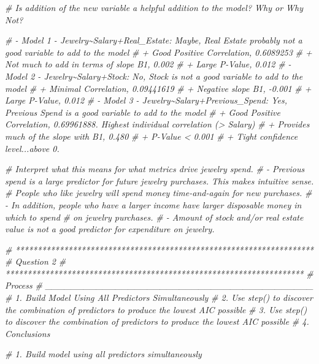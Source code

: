 \documentclass[
]{article}
\newenvironment{Shaded}{\begin{snugshade}}{\end{snugshade}}
\newcommand{\CommentTok}[1]{\textcolor[rgb]{0.56,0.35,0.01}{\textit{#1}}}
\begin{document}
\begin{Shaded}
\begin{Highlighting}[]
\CommentTok{\# Is addition of the new variable a helpful addition to the model? Why or Why Not?}
 
\CommentTok{\# {-} Model 1 {-} Jewelry\textasciitilde{}Salary+Real\_Estate: Maybe, Real Estate probably not a good variable to add to the model}
\CommentTok{\#     + Good Positive Correlation, 0.6089253}
\CommentTok{\#     + Not much to add in terms of slope B1, 0.002}
\CommentTok{\#     + Large P{-}Value, 0.012}
\CommentTok{\# {-} Model 2 {-} Jewelry\textasciitilde{}Salary+Stock: No, Stock is not a good variable to add to the model}
\CommentTok{\#     + Minimal Correlation, 0.09441619}
\CommentTok{\#     + Negative slope B1, {-}0.001 }
\CommentTok{\#     + Large P{-}Value, 0.012}
\CommentTok{\# {-} Model 3 {-} Jewelry\textasciitilde{}Salary+Previous\_Spend: Yes, Previous Spend is a good variable to add to the model}
\CommentTok{\#     + Good Positive Correlation, 0.69961888.  Highest individual correlation (\textgreater{} Salary)}
\CommentTok{\#     + Provides much of the slope with B1, 0.480}
\CommentTok{\#     + P{-}Value \textless{} 0.001}
\CommentTok{\#     + Tight confidence level...above 0.  }

\CommentTok{\# Interpret what this means for what metrics drive jewelry spend. }
\CommentTok{\# {-} Previous spend is a large predictor for future jewelry purchases.  This makes intuitive sense. }
\CommentTok{\#   People who like jewelry will spend money time{-}and{-}again for new purchases.  }
\CommentTok{\# {-} In addition, people who have a larger income have larger disposable money in which to spend}
\CommentTok{\#   on jewelry purchases.  }
\CommentTok{\# {-} Amount of stock and/or real estate value is not a good predictor for expenditure on jewelry. }



\CommentTok{\# ********************************************************************    }
\CommentTok{\# Question 2}
\CommentTok{\# ********************************************************************}
\CommentTok{\# Process}
\CommentTok{\# \_\_\_\_\_\_\_\_\_\_\_\_\_\_\_\_\_\_\_\_\_\_\_\_\_\_\_\_\_\_\_\_\_\_\_\_\_\_\_\_\_\_}
\CommentTok{\# 1. Build Model Using All Predictors Simultaneously}
\CommentTok{\# 2. Use step() to discover the combination of predictors to produce the lowest AIC possible}
\CommentTok{\# 3. Use step() to discover the combination of predictors to produce the lowest AIC possible }
\CommentTok{\# 4. Conclusions}


\CommentTok{\# 1. Build model using all predictors simultaneously }
\end{Highlighting}
\end{Shaded}
\end{document}
